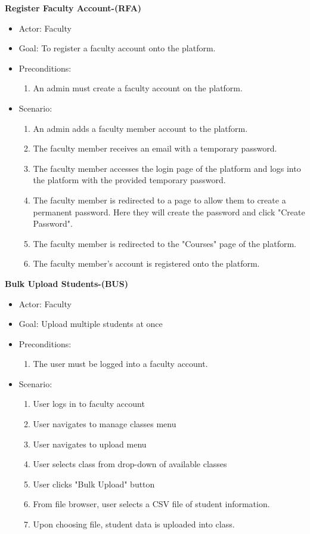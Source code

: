 \documentclass[letterpaper,12pt,oneside,listof=totoc]{scrreprt}
\begin{document}
\hfill \break
\textbf{Register Faculty Account-(RFA)}
\begin{itemize}
    \item Actor: Faculty
    \item Goal: To register a faculty account onto the platform.
    \item Preconditions:
    \begin{enumerate}
        \item An admin must create a faculty account on the platform.
    \end{enumerate}
    \item Scenario:
    \begin{enumerate}
        \item An admin adds a faculty member account to the platform.
        \item The faculty member receives an email with a temporary password.
        \item The faculty member accesses the login page of the platform and logs into the platform with the provided temporary password.
        \item The faculty member is redirected to a page to allow them to create a permanent password. Here they will create the password and click "Create Password".
        \item The faculty member is redirected to the "Courses" page of the platform.
        \item The faculty member's account is registered onto the platform.
    \end{enumerate}
\end{itemize}



\hfill \break
\textbf{Bulk Upload Students-(BUS)}
\begin{itemize}
    \item Actor: Faculty
    \item Goal: Upload multiple students at once
    \item Preconditions:
    \begin{enumerate}
        \item The user must be logged into a faculty account.
    \end{enumerate}
    \item Scenario:
    \begin{enumerate}
        \item User logs in to faculty account
        \item User navigates to manage classes menu
        \item User navigates to upload menu
        \item User selects class from drop-down of available classes
        \item User clicks "Bulk Upload" button
        \item From file browser, user selects a CSV file of student information.
        \item Upon choosing file, student data is uploaded into class.
    \end{enumerate}
\end{itemize}
\end{document}

